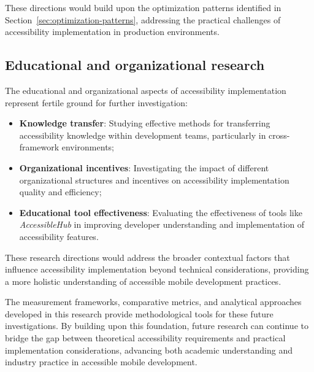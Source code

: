 These directions would build upon the optimization patterns identified in Section~\ref{sec:optimization-patterns}, addressing the practical challenges of accessibility implementation in production environments.

\subsection{Educational and organizational research}
\label{subsec:future-educational}

The educational and organizational aspects of accessibility implementation represent fertile ground for further investigation:

\begin{itemize}
    \item \textbf{Knowledge transfer}: Studying effective methods for transferring accessibility knowledge within development teams, particularly in cross-framework environments;

    \item \textbf{Organizational incentives}: Investigating the impact of different organizational structures and incentives on accessibility implementation quality and efficiency;

    \item \textbf{Educational tool effectiveness}: Evaluating the effectiveness of tools like \textit{AccessibleHub} in improving developer understanding and implementation of accessibility features.
\end{itemize}

These research directions would address the broader contextual factors that influence accessibility implementation beyond technical considerations, providing a more holistic understanding of accessible mobile development practices.

The measurement frameworks, comparative metrics, and analytical approaches developed in this research provide methodological tools for these future investigations. By building upon this foundation, future research can continue to bridge the gap between theoretical accessibility requirements and practical implementation considerations, advancing both academic understanding and industry practice in accessible mobile development.